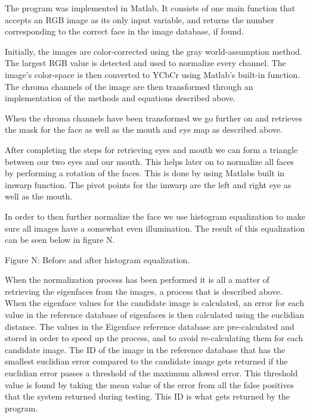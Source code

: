 The program was implemented in Matlab. It consists of one main function that accepts an RGB image as its only input variable, and returns the number corresponding to the correct face in the image database, if found.

Initially, the images are color-corrected using the gray world-assumption method. The largest RGB value is detected and used to normalize every channel. The image’s color-space is then converted to YCbCr using Matlab’s built-in function. The chroma channels of the image are then transformed through an implementation of the methods and equations described above.

When the chroma channels have been transformed we go further on and retrieves the mask for the face as well as the mouth and eye map as described above.

After completing the steps for retrieving eyes and mouth we can form a triangle between our two eyes and our mouth. This helps later on to normalize all faces by performing a rotation of the faces. This is done by using Matlabs built in imwarp function. The pivot points for the imwarp are the left and right eye as well as the mouth.

In order to then further normalize the face we use histogram equalization to make sure all images have a somewhat even illumination. The result of this equalization can be seen below in figure N.

Figure N: Before and after histogram equalization.

When the normalization process has been performed it is all a matter of retrieving the eigenfaces from the images, a process that is described above. When the eigenface values for the candidate image is calculated, an error for each value in the reference database of eigenfaces is then calculated using the euclidian distance. The values in the Eigenface reference database are pre-calculated and stored in order to speed up the process, and to avoid re-calculating them for each candidate image. The ID of the image in the reference database that has the smallest euclidian error compared to the candidate image gets returned if the euclidian error passes a threshold of the maximum allowed error. This threshold value is found by taking the mean value of the error from all the false positives that the system returned during testing. This ID is what gets returned by the program.
